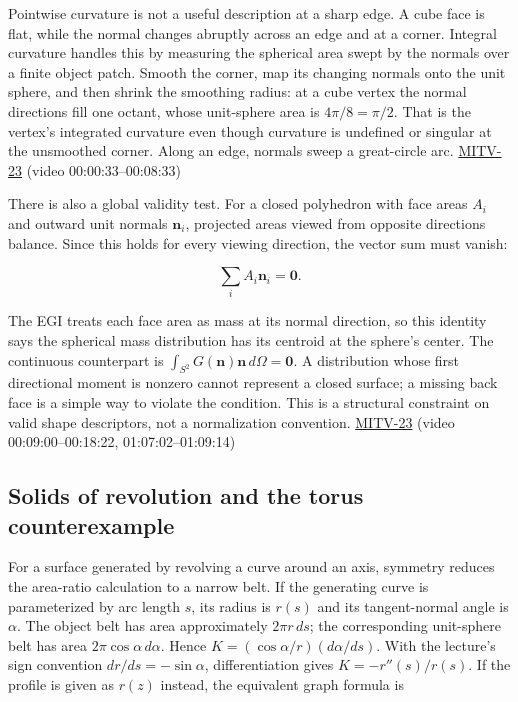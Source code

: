 \hypertarget{04-visual-computing-ii-ch032-corners-closed-surfaces-and-the-zero-centroid-condition}{}

Pointwise curvature is not a useful description at a sharp edge. A cube face is flat, while the normal changes abruptly across an edge and at a corner. Integral curvature handles this by measuring the spherical area swept by the normals over a finite object patch. Smooth the corner, map its changing normals onto the unit sphere, and then shrink the smoothing radius: at a cube vertex the normal directions fill one octant, whose unit-sphere area is \(4\pi/8=\pi/2\). That is the vertex's integrated curvature even though curvature is undefined or singular at the unsmoothed corner. Along an edge, normals sweep a great-circle arc. \hyperref[04-visual-computing-ii-ch036-mitv-23---gaussian-image-solids-of-revolution-direction-histograms-regular-polyhedra]{MITV-23} (video 00:00:33--00:08:33)

There is also a global validity test. For a closed polyhedron with face areas \(A_i\) and outward unit normals \(\mathbf n_i\), projected areas viewed from opposite directions balance. Since this holds for every viewing direction, the vector sum must vanish:

\[
\sum_i A_i\mathbf n_i=\mathbf 0.
\]

The EGI treats each face area as mass at its normal direction, so this identity says the spherical mass distribution has its centroid at the sphere's center. The continuous counterpart is \(\int_{S^2}G(\mathbf n)\mathbf n\,d\Omega=\mathbf 0\). A distribution whose first directional moment is nonzero cannot represent a closed surface; a missing back face is a simple way to violate the condition. This is a structural constraint on valid shape descriptors, not a normalization convention. \hyperref[04-visual-computing-ii-ch036-mitv-23---gaussian-image-solids-of-revolution-direction-histograms-regular-polyhedra]{MITV-23} (video 00:09:00--00:18:22, 01:07:02--01:09:14)

\subsection{Solids of revolution and the torus counterexample}\label{04-visual-computing-ii-ch032-solids-of-revolution-and-the-torus-counterexample}

\hypertarget{04-visual-computing-ii-ch032-solids-of-revolution-and-the-torus-counterexample}{}

For a surface generated by revolving a curve around an axis, symmetry reduces the area-ratio calculation to a narrow belt. If the generating curve is parameterized by arc length \(s\), its radius is \(r(s)\) and its tangent-normal angle is \(\alpha\). The object belt has area approximately \(2\pi r\,ds\); the corresponding unit-sphere belt has area \(2\pi\cos\alpha\,d\alpha\). Hence \(K=(\cos\alpha/r)(d\alpha/ds)\). With the lecture's sign convention \(dr/ds=-\sin\alpha\), differentiation gives \(K=-r''(s)/r(s)\). If the profile is given as \(r(z)\) instead, the equivalent graph formula is

